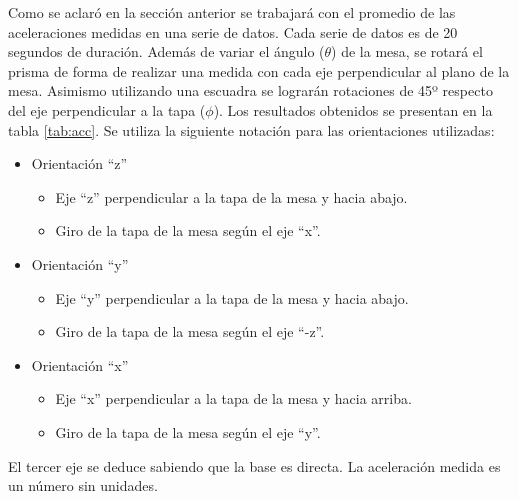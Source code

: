 \documentclass[spanish,12pt,a4paper,titlepage]{report}
\begin{document}
Como se aclaró en la sección anterior se trabajará con el promedio de las aceleraciones medidas en una serie de datos. Cada serie de datos es de 20 segundos de duración. Además de variar el ángulo ($\theta$) de la mesa, se rotará el prisma de forma de realizar una medida con cada eje perpendicular al plano de la mesa. Asimismo utilizando una escuadra se lograrán rotaciones de 45º respecto del eje perpendicular a la tapa ($\phi$). Los resultados obtenidos se presentan en la tabla \ref{tab:acc}. Se utiliza la siguiente notación para las orientaciones utilizadas:
\begin{itemize}
	\item Orientación ``z''
	\begin{itemize}
		\item Eje ``z'' perpendicular a la tapa de la mesa y hacia abajo.
		\item Giro de la tapa de la mesa según el eje ``x''.
	\end{itemize}
	\item Orientación ``y''
	\begin{itemize}
		\item Eje ``y'' perpendicular a la tapa de la mesa y hacia abajo.
		\item Giro de la tapa de la mesa según el eje ``-z''.
	\end{itemize}
	\item Orientación ``x''
	\begin{itemize}
		\item Eje ``x'' perpendicular a la tapa de la mesa y hacia arriba.
		\item Giro de la tapa de la mesa según el eje ``y''.
	\end{itemize}
\end{itemize}
El tercer eje se deduce sabiendo que la base es directa. La aceleración medida es un número sin unidades.
\end{document}
